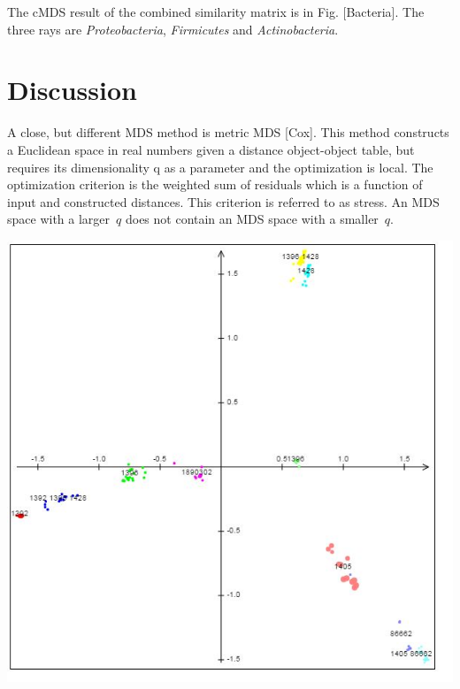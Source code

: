 \documentclass[10pt,a4paper]{article}
\begin{document}
The cMDS result of the combined similarity matrix is in Fig. [Bacteria]. 
The three rays are {\it Proteobacteria}, {\it Firmicutes} and {\it Actinobacteria}. 


\section{Discussion}

A close, but different MDS method is metric MDS [Cox]. 
This method constructs a Euclidean space in real numbers given a distance object-object table, 
but requires its dimensionality q as a parameter and the optimization is local. 
The optimization criterion is the weighted sum of residuals which is a function of input and constructed distances. 
This criterion is referred to as stress.
 An MDS space with a larger~$q$ does not contain an MDS space with a smaller~$q$.





\includegraphics [scale=0.7] {Bacillus_cereus.JPG}
\end{document}
